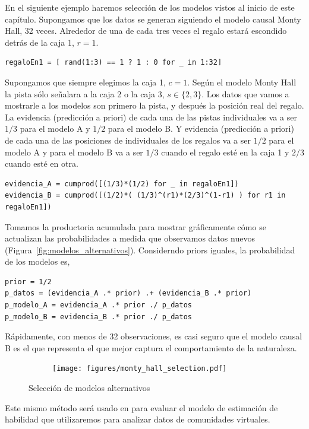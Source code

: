 \documentclass[a4paper,10pt]{book}
\theoremstyle{definition}
\begin{document}
En el siguiente ejemplo haremos selecci\'on de los modelos vistos al inicio de este cap\'itulo.
%
Supongamos que los datos se generan siguiendo el modelo causal Monty Hall, 32 veces.
%
Alrededor de una de cada tres veces el regalo estar\'a escondido detr\'as de la caja 1, $r=1$.
%
\begin{lstlisting}[backgroundcolor=\color{all}]
regaloEn1 = [ rand(1:3) == 1 ? 1 : 0 for _ in 1:32]
\end{lstlisting} 
%
Supongamos que siempre elegimos la caja 1, $c=1$.
%
Según el modelo Monty Hall la pista s\'olo se\~nalara a la caja 2 o la caja 3, $s \in \{2,3\}$.
%
Los datos que vamos a mostrarle a los modelos son primero la pista, y despu\'es la posici\'on real del regalo.
%
La evidencia (predicci\'on a priori) de cada una de las pistas individuales va a ser $1/3$ para el modelo A y $1/2$ para el modelo B.
%
Y evidencia (predicci\'on a priori) de cada una de las posiciones de individuales de los regalos va a ser $1/2$ para el modelo A y para el modelo B va a ser $1/3$ cuando el regalo est\'e en la caja 1 y $2/3$ cuando est\'e en otra.
%
\begin{lstlisting}[backgroundcolor=\color{all}]
evidencia_A = cumprod([(1/3)*(1/2) for _ in regaloEn1])
evidencia_B = cumprod([(1/2)*( (1/3)^(r1)*(2/3)^(1-r1) ) for r1 in regaloEn1])
\end{lstlisting} 
%
Tomamos la productoria acumulada para mostrar gr\'aficamente c\'omo se actualizan las probabilidades a medida que observamos datos nuevos (Figura~\ref{fig:modelos_alternativos}).
%
Considerndo priors iguales, la probabilidad de los modelos es,
%
\begin{lstlisting}[backgroundcolor=\color{all}]
prior = 1/2
p_datos = (evidencia_A .* prior) .+ (evidencia_B .* prior)
p_modelo_A = evidencia_A .* prior ./ p_datos
p_modelo_B = evidencia_B .* prior ./ p_datos
\end{lstlisting} 
%
R\'apidamente, con menos de 32 observaciones, es casi seguro que el modelo causal B es el que representa el que mejor captura el comportamiento de la naturaleza.
%
\begin{figure}[H]
    \centering
    \begin{subfigure}[b]{0.5\textwidth}
    \texttt{[image: figures/monty\_hall\_selection.pdf]}
    \end{subfigure}
    \caption{
    Selecci\'on de modelos alternativos
    }
    \label{fig:estrategias_individuales}
\end{figure}
%
Este mismo m\'etodo ser\'a usado en para evaluar el modelo de estimaci\'on de habilidad que utilizaremos para analizar datos de comunidades virtuales.
\end{document}
